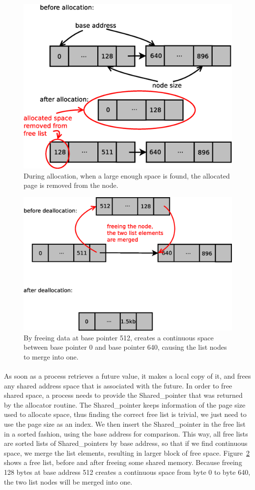 \begin{figure}[!ht]
\includegraphics[width=0.6\columnwidth]{figures/alloc}
\caption{During allocation, when a large enough space is found, the allocated page is removed from the node.}
\label{fig:alloc}
\end{figure}

\begin{figure}[!ht]
\includegraphics[width=0.7\columnwidth]{figures/free}
\caption{By freeing data at base pointer 512, creates a continuous space between base pointer 0 and
base pointer 640, causing the list nodes to merge into one.}
\label{fig:free}
\end{figure}

\paragraph{}
As soon as a process retrieves a future value, it makes a local copy of it, and frees any shared address space
that is associated with the future.  In order to free shared space, a process needs to provide the Shared\_pointer
that was returned by the allocator routine.  The Shared\_pointer keeps information of the page size used to 
allocate space, thus finding the correct free list is trivial, we just need to use the page size as an index.
We then insert the Shared\_pointer in the free list in a sorted fashion, using the base address for comparison.
This way, all free lists are sorted lists of Shared\_pointers by base address, so that if we find continuous
space, we merge the list elements, resulting in larger block of free space.  Figure~\ref{fig:free} shows a 
free list, before and after freeing some shared memory.  Because freeing 128 bytes at base address 512 creates
a continuous space from byte 0 to byte 640, the two list nodes will be merged into one.

